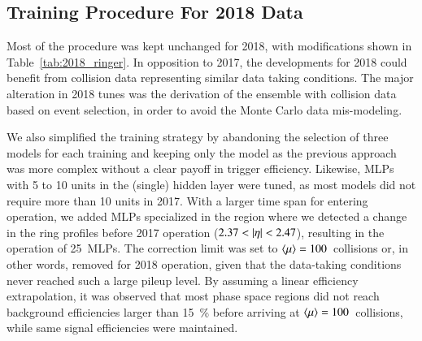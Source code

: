 
\FloatBarrier
\subsection{Training Procedure For 2018 Data}\label{ssec:2018}

Most of the procedure was kept unchanged for 2018, with modifications shown in
Table~\ref{tab:2018_ringer}.
In opposition to 2017, the developments for 2018
could benefit from collision data 
representing similar data taking conditions.
The major alteration in 2018 tunes was the derivation of the \rnn{} ensemble with collision data based on \Zee{} \tnp{} event selection, in order to avoid the Monte Carlo data mis-modeling.

We also simplified the training strategy by abandoning the selection of three
models for each training and keeping only the \spmax{} model as the previous approach was more complex without a clear
payoff in trigger efficiency.
Likewise, MLPs with 5 to 10 units in the (single) hidden layer were tuned, as most models did not require
more than 10 units in 2017. With a larger time span for entering operation, we
added MLPs specialized in the region where we detected a change in the ring
profiles before 2017 operation ($2.37<\abseta<2.47$), resulting in the operation of
\SI{25}{MLPs}. The correction limit was set to
$\langle \mu \rangle{}=100$~collisions or, in other words, removed for 2018 operation, given
that the data-taking 
conditions never reached such a large pileup level. By
assuming a linear efficiency extrapolation,%
it was observed that most phase space regions did not reach background efficiencies
larger than \SI{15}{\%} before arriving at $\langle \mu \rangle=100$~collisions, while same
signal efficiencies were maintained.






